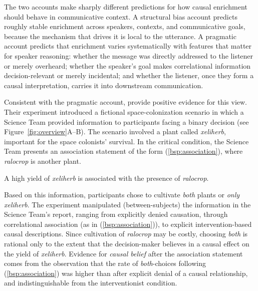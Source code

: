\documentclass[10pt,letterpaper]{article}
\begin{document}
The two accounts make sharply different predictions for how causal enrichment should behave in communicative context.
A structural bias account predicts roughly stable enrichment across speakers, contexts, and communicative goals, because the mechanism that drives it is local to the utterance.
A pragmatic account predicts that enrichment varies systematically with features that matter for speaker reasoning: whether the message was directly addressed to the listener or merely overheard; whether the speaker's goal makes correlational information decision-relevant or merely incidental; and whether the listener, once they form a causal interpretation, carries it into downstream communication.

Consistent with the pragmatic account, \citet{lassiter2024rationality} provide positive evidence for this view.
Their experiment introduced a fictional space-colonization scenario in which a Science Team provided information to participants facing a binary decision (see Figure~\ref{fig:overview}A--B).
The scenario involved a plant called \textit{xeliherb}, important for the space colonists' survival.
In the critical condition, the Science Team presents an association statement of the form (\ref{bsp:association}), where \textit{ralocrop} is another plant.
%
\begin{exe}
    \ex \label{bsp:association} A high yield of \textit{xeliherb} is associated with the presence of \textit{ralocrop}.
\end{exe}
%
Based on this information, participants chose to cultivate \textit{both} plants or \textit{only} \textit{xeliherb}.
The experiment manipulated (between-subjects) the information in the Science Team's report, ranging from explicitly denied causation, through correlational association (as in (\ref{bsp:association})), to explicit intervention-based causal descriptions.
Since cultivation of \textit{ralocrop} may be costly, choosing \textit{both} is rational only to the extent that the decision-maker believes in a causal effect on the yield of \textit{xeliherb}.
Evidence for \textit{causal belief} after the association statement comes from the observation that the rate of \textit{both}-choices following (\ref{bsp:association}) was higher than after explicit denial of a causal relationship, and indistinguishable from the interventionist condition.
\end{document}

